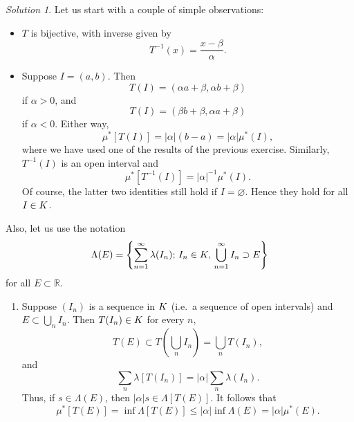 \documentclass{report}
\newcommand{\bb}[1]{\mathbb{#1}}
\let\sc\relax
\newcommand{\sc}[1]{\mathscr{#1}}
\theoremstyle{remark}
\newtheorem*{solution}{Solution}
\begin{document}
\begin{solution}
  Let us start with a couple of simple observations:
  \begin{itemize}
    \item $T$ is bijective, with inverse given by
      \begin{equation*}
        T^{-1}(x) = \frac{x - \beta}{\alpha}.
      \end{equation*}
    \item Suppose $I = (a,b)$. Then
      \begin{equation*}
        T(I) = (\alpha a + \beta, \alpha b + \beta)
      \end{equation*}
      if $\alpha > 0$, and
      \begin{equation*}
        T(I) = (\beta b + \beta, \alpha a + \beta)
      \end{equation*}
      if $\alpha < 0$. Either way,
      \begin{equation*}
        \mu^*[T(I)] = |\alpha| (b - a) = |\alpha| \mu^*(I),
      \end{equation*}
      where we have used one of the results of the previous exercise. Similarly, $T^{-1}(I)$ is an open interval and
      \begin{equation*}
        \mu^*[T^{-1}(I)] = |\alpha|^{-1} \mu^*(I).
      \end{equation*}
      Of course, the latter two identities still hold if $I = \varnothing$. Hence they hold for all $I \in \sc K$.
  \end{itemize}
  Also, let us use the notation
  \begin{equation*}
    \Lambda(E) = \left\{ \sum_{n=1}^\infty \lambda(I_n); \, I_n \in \sc K, \, \bigcup_{n=1}^\infty I_n \supset E \right\}
  \end{equation*}
  for all $E \subset \bb R$.

  \begin{enumerate}[label=(\alph*)]
    \item Suppose $(I_n)$ is a sequence in $\sc K$ (i.e.\ a sequence of open intervals) and $E \subset \bigcup_n I_n$. Then $T(I_n) \in \sc K$ for every $n$,
      \begin{equation*}
        T(E) \subset T \left( \bigcup_n I_n \right) = \bigcup_n T(I_n),
      \end{equation*}
      and
      \begin{equation*}
        \sum_n \lambda[T(I_n)] = |\alpha| \sum_n \lambda(I_n).
      \end{equation*}
      Thus, if $s \in \Lambda(E)$, then $|\alpha| s \in \Lambda[T(E)]$. It follows that
      \begin{equation*}
        \mu^*[T(E)] = \inf \Lambda[T(E)] \le |\alpha| \inf \Lambda(E) = |\alpha| \mu^*(E).
      \end{equation*}


\end{enumerate}
\end{solution}
\end{document}
